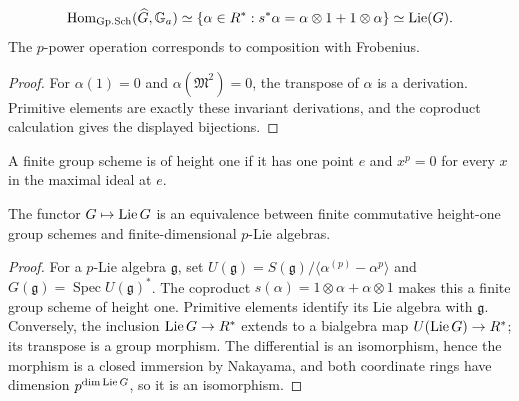 \begin{proposition}
\label{mumford-prop-cartier-primitives}
\[
\operatorname{Hom}_{\mathrm{Gp.Sch}}(\widehat G,\mathbb G_a)
\simeq\{\alpha\in R^*:s^*\alpha=\alpha\otimes1+1\otimes\alpha\}
\simeq\operatorname{Lie}(G).
\]
The $p$-power operation corresponds to composition with Frobenius.
\end{proposition}
\begin{proof}
For $\alpha(1)=0$ and $\alpha(\mathfrak M^2)=0$, the transpose of $\alpha$
is a derivation. Primitive elements are exactly these invariant derivations,
and the coproduct calculation gives the displayed bijections.
\end{proof}

\begin{definition}
\label{mumford-def-height-one-group}
A finite group scheme is of height one if it has one point $e$ and
$x^p=0$ for every $x$ in the maximal ideal at $e$.
\end{definition}

\begin{theorem}
\label{mumford-thm-height-one-equivalence}
The functor $G\mapsto\operatorname{Lie} G$ is an equivalence between finite commutative
height-one group schemes and finite-dimensional $p$-Lie algebras.
\end{theorem}
\begin{proof}
For a $p$-Lie algebra $\mathfrak g$, set
$U(\mathfrak g)=S(\mathfrak g)/\langle\alpha^{(p)}-\alpha^p\rangle$ and
$G(\mathfrak g)=\operatorname{Spec}U(\mathfrak g)^*$. The coproduct
$s(\alpha)=1\otimes\alpha+\alpha\otimes1$ makes this a finite group
scheme of height one. Primitive elements identify its Lie algebra with
$\mathfrak g$. Conversely, the inclusion $\operatorname{Lie} G\to R^*$ extends to a
bialgebra map $U(\operatorname{Lie} G)\to R^*$; its transpose is a group morphism.
The differential is an isomorphism, hence the morphism is a closed immersion
by Nakayama, and both coordinate rings have dimension
$p^{\dim\operatorname{Lie} G}$, so it is an isomorphism.
\end{proof}

